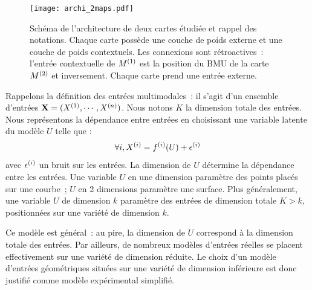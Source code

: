 \documentclass[../main]{subfiles}
\begin{document}
\begin{figure}[t]
	\centering\texttt{[image: archi\_2maps.pdf]}
	\caption{Schéma de l'architecture de deux cartes étudiée et rappel des notations. Chaque carte possède une couche de poids externe et une couche de poids contextuels. Les connexions sont rétroactives~: l'entrée contextuelle de $M^{({1})}$ est la position du BMU de la carte $M^{({2})}$ et inversement. Chaque carte prend une entrée externe.\label{fig:archis}}
\end{figure}

Rappelons la définition des entrées multimodales~: il s'agit d'un ensemble d'entrées $\mathbf{X} = (X^{({1})}, \cdots, X^{({n})})$. Nous notons $K$ la dimension totale des entrées.
Nous représentons la dépendance entre entrées en choisissant une variable latente du modèle $U$ telle que :
$$ \forall i, X^{({i})} = f^{({i})}(U) + \epsilon^{({i})}$$
avec $\epsilon^{({i})}$ un bruit sur les entrées.
La dimension de $U$ détermine la dépendance entre les entrées.
Une variable $U$ en une dimension paramètre des points placés sur une courbe~; $U$ en 2 dimensions paramètre une surface. Plus généralement, une variable $U$ de dimension $k$ paramètre des entrées de dimension totale $K > k$, positionnées sur une variété de dimension $k$.

Ce modèle est général~: au pire, la dimension de $U$ correspond à la dimension totale des entrées. 
Par ailleurs, de nombreux modèles d'entrées réelles se placent effectivement sur une variété de dimension réduite. Le choix d'un modèle d'entrées géométriques situées sur une variété de dimension inférieure est donc justifié comme modèle expérimental simplifié.
\end{document}
